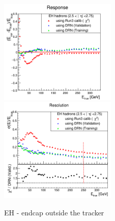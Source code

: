 \begin{figure}
\includegraphics[width=0.495\textwidth]{./plots_pdf/HCAL_plots/Trained_target_ratioflip_0_500_10/pdf/EH_ec_out/EC_outside_tracker_corrEtaEndcapEcalHcal.png}
\includegraphics[width=0.495\textwidth]{./plots_pdf/HCAL_plots/Trained_target_ratioflip_0_500_10/pdf/EH_ec_out/EC_outside_tracker_corrEtaEndcapEcalHcal_reso.png}
\caption{EH - endcap outside the tracker}
\end{figure}
